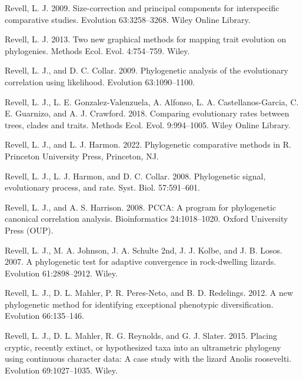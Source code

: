 \documentclass[fleqn,10pt,lineno]{wlpeerj}
\newlength{\cslhangindent}
\newlength{\cslentryspacingunit} %
\newenvironment{CSLReferences}[2] %
 {%
  \setlength{\parindent}{0pt}
  \ifodd #1
  \let\oldpar\par
  \def\par{\hangindent=\cslhangindent\oldpar}
  \fi
  \setlength{\parskip}{#2\cslentryspacingunit}
 }%
 {}
\begin{document}
\begin{CSLReferences}{1}{0}
\leavevmode{}%
Revell, L. J. 2009. Size-correction and principal components for
interspecific comparative studies. Evolution 63:3258--3268. Wiley Online
Library.

\leavevmode{}%
Revell, L. J. 2013. Two new graphical methods for mapping trait
evolution on phylogenies. Methods Ecol. Evol. 4:754--759. Wiley.

\leavevmode{}%
Revell, L. J., and D. C. Collar. 2009. Phylogenetic analysis of the
evolutionary correlation using likelihood. Evolution 63:1090--1100.

\leavevmode{}%
Revell, L. J., L. E. Gonzalez-Valenzuela, A. Alfonso, L. A.
Castellanos-Garcia, C. E. Guarnizo, and A. J. Crawford. 2018. Comparing
evolutionary rates between trees, clades and traits. Methods Ecol. Evol.
9:994--1005. Wiley Online Library.

\leavevmode{}%
Revell, L. J., and L. J. Harmon. 2022. Phylogenetic comparative methods
in {R}. Princeton University Press, Princeton, NJ.

\leavevmode{}%
Revell, L. J., L. J. Harmon, and D. C. Collar. 2008. Phylogenetic
signal, evolutionary process, and rate. Syst. Biol. 57:591--601.

\leavevmode{}%
Revell, L. J., and A. S. Harrison. 2008. {PCCA}: A program for
phylogenetic canonical correlation analysis. Bioinformatics
24:1018--1020. Oxford University Press (OUP).

\leavevmode{}%
Revell, L. J., M. A. Johnson, J. A. Schulte 2nd, J. J. Kolbe, and J. B.
Losos. 2007. A phylogenetic test for adaptive convergence in
rock-dwelling lizards. Evolution 61:2898--2912. Wiley.

\leavevmode{}%
Revell, L. J., D. L. Mahler, P. R. Peres-Neto, and B. D. Redelings.
2012. A new phylogenetic method for identifying exceptional phenotypic
diversification. Evolution 66:135--146.

\leavevmode{}%
Revell, L. J., D. L. Mahler, R. G. Reynolds, and G. J. Slater. 2015.
Placing cryptic, recently extinct, or hypothesized taxa into an
ultrametric phylogeny using continuous character data: A case study with
the lizard {Anolis} roosevelti. Evolution 69:1027--1035. Wiley.


\end{CSLReferences}
\end{document}
